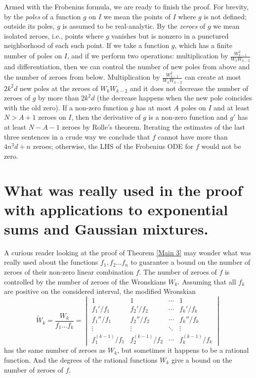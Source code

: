 \documentclass{article}
\begin{document}
Armed with the  Frobenius formula, we are ready to finish the proof. For brevity, by the \emph{poles} of a function $g$ on $I$ we mean the points of $I$ where $g$ is not defined; outside its poles, $g$ is assumed to be real-analytic. By the \emph{zeroes} of $g$ we mean isolated zeroes, i.e., points where $g$ vanishes but is nonzero in a punctured neighborhood of each such point.
If we take a function $g$, which has a finite number of poles on $I$, and if we perform two operations: multiplication by $\frac{W_{k-1}^2}{W_k W_{k-2}}$ and differentiation, then we can control the number of new poles from above and the number of zeroes from below. 
Multiplication by $\frac{W_{k-1}^2}{W_k W_{k-2}}$ can create at most $2k^2d$ new poles at the zeroes of $W_k W_{k-2}$ and it does not decrease the number of zeroes of $g$ by more than $2k^2d$ (the decrease happens when the new pole coincides with the old zero). If a non-zero function $g$ has at most $A$ poles on $I$ and at least $N>A+1$ zeroes on $I$, then the derivative of $g$ is a non-zero function and $g'$ has at least $N-A-1$ zeroes by Rolle's theorem.  Iterating the estimates of the last three sentences in a crude way we conclude
that $f$ cannot have more than $4n^3d+n$ zeroes; otherwise, the LHS of the Frobenius ODE for $f$ would not be zero.  
\section{What was really used in the proof with applications to exponential sums and Gaussian mixtures.}
A curious reader looking at the proof of Theorem \ref{Main 3} may wonder what was really used about the functions $f_1,f_2\dots f_n$ to guarantee a bound on the number of zeroes of their non-zero linear combination $f$. The number of zeroes of $f$ is controlled by the number of zeroes of the Wronskians $W_k$. Assuming that all $f_k$ are positive on the considered interval, the modified Wronskian $$\widetilde W_k= \frac{W_k}{f_1 \dots f_k}=\begin{vmatrix}
1 & 1 & \cdots & 1 \\
f_1'/f_1 & f_2'/f_2 & \cdots & f_k'/f_k \\
f_1''/f_1 & f_2''/f_2 & \cdots & f_k''/f_k \\
\vdots & \vdots & \ddots & \vdots \\
f_1^{(k-1)}/f_1 & f_2^{(k-1)}/f_2 & \cdots & f_k^{(k-1)}/f_k
\end{vmatrix}$$ has the same number of zeroes as $W_k$, but sometimes it happens to be a rational function. And the degrees of the rational functions $W_k$ give a bound on the number of zeroes of $f$. 
\end{document}
